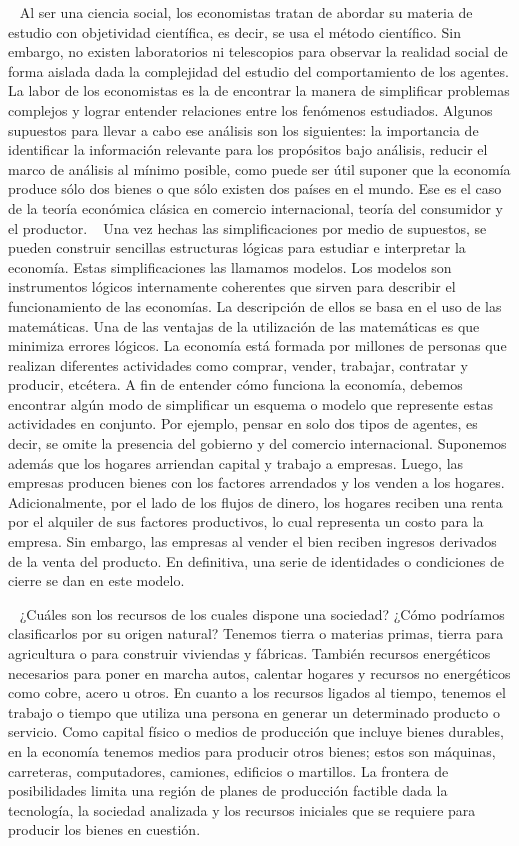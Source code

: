 \documentclass[
  letterpaper,
  DIV=11,
  numbers=noendperiod]{scrreport}
\begin{document}
~ Al ser una ciencia social, los economistas tratan de abordar su
materia de estudio con objetividad científica, es decir, se usa el
método científico. Sin embargo, no existen laboratorios ni telescopios
para observar la realidad social de forma aislada dada la complejidad
del estudio del comportamiento de los agentes. La labor de los
economistas es la de encontrar la manera de simplificar problemas
complejos y lograr entender relaciones entre los fenómenos estudiados.
Algunos supuestos para llevar a cabo ese análisis son los siguientes: la
importancia de identificar la información relevante para los propósitos
bajo análisis, reducir el marco de análisis al mínimo posible, como
puede ser útil suponer que la economía produce sólo dos bienes o que
sólo existen dos países en el mundo. Ese es el caso de la teoría
económica clásica en comercio internacional, teoría del consumidor y el
productor. ~ Una vez hechas las simplificaciones por medio de supuestos,
se pueden construir sencillas estructuras lógicas para estudiar e
interpretar la economía. Estas simplificaciones las llamamos modelos.
Los modelos son instrumentos lógicos internamente coherentes que sirven
para describir el funcionamiento de las economías. La descripción de
ellos se basa en el uso de las matemáticas. Una de las ventajas de la
utilización de las matemáticas es que minimiza errores lógicos. La
economía está formada por millones de personas que realizan diferentes
actividades como comprar, vender, trabajar, contratar y producir,
etcétera. A fin de entender cómo funciona la economía, debemos encontrar
algún modo de simplificar un esquema o modelo que represente estas
actividades en conjunto. Por ejemplo, pensar en solo dos tipos de
agentes, es decir, se omite la presencia del gobierno y del comercio
internacional. Suponemos además que los hogares arriendan capital y
trabajo a empresas. Luego, las empresas producen bienes con los factores
arrendados y los venden a los hogares. Adicionalmente, por el lado de
los flujos de dinero, los hogares reciben una renta por el alquiler de
sus factores productivos, lo cual representa un costo para la empresa.
Sin embargo, las empresas al vender el bien reciben ingresos derivados
de la venta del producto. En definitiva, una serie de identidades o
condiciones de cierre se dan en este modelo.

~ ¿Cuáles son los recursos de los cuales dispone una sociedad? ¿Cómo
podríamos clasificarlos por su origen natural? Tenemos tierra o materias
primas, tierra para agricultura o para construir viviendas y fábricas.
También recursos energéticos necesarios para poner en marcha autos,
calentar hogares y recursos no energéticos como cobre, acero u otros. En
cuanto a los recursos ligados al tiempo, tenemos el trabajo o tiempo que
utiliza una persona en generar un determinado producto o servicio. Como
capital físico o medios de producción que incluye bienes durables, en la
economía tenemos medios para producir otros bienes; estos son máquinas,
carreteras, computadores, camiones, edificios o martillos. La frontera
de posibilidades limita una región de planes de producción factible dada
la tecnología, la sociedad analizada y los recursos iniciales que se
requiere para producir los bienes en cuestión.
\end{document}
